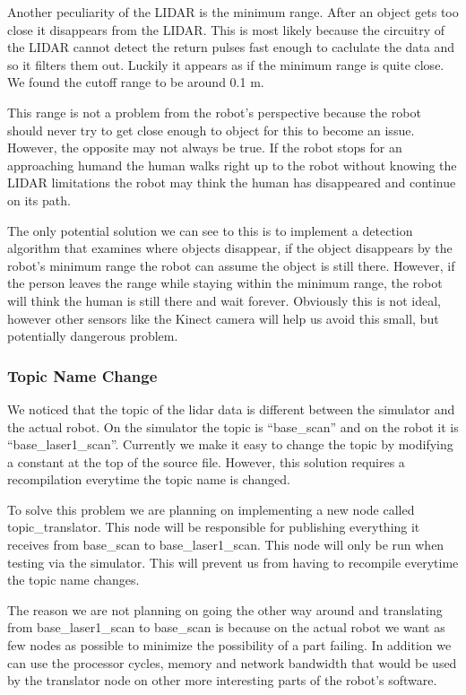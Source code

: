 Another peculiarity of the LIDAR is the minimum range.  After an
object gets too close it disappears from the LIDAR.  This is most
likely because the circuitry of the LIDAR cannot detect the return
pulses fast enough to caclulate the data and so it filters them out.
Luckily it appears as if the minimum range is quite close. We found
the cutoff range to be around 0.1 m.

This range is not a problem from the robot's perspective because the
robot should never try to get close enough to object for this to
become an issue.  However, the opposite may not always be true. If the
robot stops for an approaching humand the human walks right up to the
robot without knowing the LIDAR limitations the robot may think the
human has disappeared and continue on its path.

The only potential solution we can see to this is to implement a
detection algorithm that examines where objects disappear, if the
object disappears by the robot's minimum range the robot can assume
the object is still there.  However, if the person leaves the range
while staying within the minimum range, the robot will think the human
is still there and wait forever. Obviously this is not ideal, however
other sensors like the Kinect camera will help us avoid this small, but potentially dangerous problem.

\subsubsection{Topic Name Change}
We noticed that the topic of the lidar data is different between the
simulator and the actual robot.  On the simulator the topic is
``base\_scan'' and on the robot it is ``base\_laser1\_scan''.  Currently
we make it easy to change the topic by modifying a constant at the top
of the source file.  However, this solution requires a recompilation
everytime the topic name is changed.

To solve this problem we are planning on implementing a new node
called topic\_translator.  This node will be responsible for
publishing everything it receives from base\_scan to
base\_laser1\_scan.  This node will only be run when testing via the
simulator.  This will prevent us from having to recompile everytime
the topic name changes.

The reason we are not planning on going the other way around and
translating from base\_laser1\_scan to base\_scan is because on the
actual robot we want as few nodes as possible to minimize the
possibility of a part failing.  In addition we can use the processor
cycles, memory and network bandwidth that would be used by the translator node on
other more interesting parts of the robot's software.

